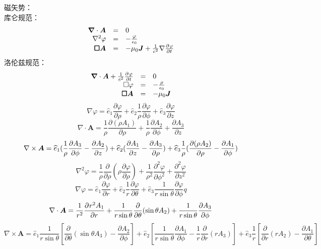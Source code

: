 \documentclass[UTF8,9pt]{ctexart}
\begin{document}
磁矢势：\\
库仑规范：
$$\ar[rcl]{
    \bm{\nabla}\cdot \bm{A}&=&0\\
    \nabla^2 \varphi&=&-\f{\varphi}{\epsilon_0}\\
    \bm{\square A}&=&-\mu_0\bm{J}+\ff{c^2}\nabla\pt{\varphi}
}$$
洛伦兹规范：
$$\ar[rcl]{
    \bm{\nabla}\cdot\bm{A}+\ff{c^2}\pt{\varphi}&=&0\\
    \square \varphi&=&-\f{\rho}{\epsilon_0}\\
    \bm{\square A}&=&-\mu_0\bm{J}
}$$
$$\nabla \varphi = \hat e_1 \frac { \partial \varphi } { \partial \rho } + \hat e_2 \frac { 1 } { \rho } \frac { \partial \varphi } { \partial \phi } + \hat { e } _ { 3 } \frac { \partial \varphi } { \partial z }$$
$$\nabla \cdot \bm{ A } = \frac { 1 } { \rho } \frac { \partial ( \rho A _ { 1 } ) } { \partial \rho } + \frac { 1 } { \rho } \frac { \partial A _ { 2 } } { \partial \phi } + \frac { \partial A _ { 3 } } { \partial z }$$
$$ { \nabla \times \bm{ A } } =\hat e_1 (\ff{\rho} \frac { \partial A_3} { \partial \phi } - \frac { \partial A _ { 2 } } { \partial z } ) + \hat { e } _ { 2 } ( \frac { \partial A _ { 1 } } { \partial z } - \frac { \partial A _ { 3 } } { \partial \rho } ) + \hat { e } _ { 3 } \frac { 1 } { \rho } ( \frac { \partial ( \rho A _ { 2 } ) } { \partial \rho } - \frac { \partial A _ { 1 } } { \partial \phi } )$$
$$\nabla ^ { 2 } \varphi = \frac { 1 } { \rho } \frac { \partial } { \partial \rho } ( \rho \frac { \partial \varphi } { \partial \rho } ) + \frac { 1 } { \rho ^ { 2 } } \frac { \partial ^ { 2 } \varphi } { \partial \phi ^ { 2 } } + \frac { \partial ^ { 2 } \varphi } { \partial z ^ { 2 } }$$
$$\nabla \varphi = \hat { e } _ { 1 } \frac { \partial \varphi } { \partial r } + \hat { e } _ { 2 } \frac { 1 } { r } \frac { \partial \varphi } { \partial \theta } + \hat { e } _ { 3 } \frac { 1 } { r \sin \theta } \frac { \partial \varphi } { \partial \phi }q$$
$$\nabla \cdot \bm{ A } = \ff{r^2} \pp{r^2A_1}{r} + \frac { 1 } { r \sin \theta } \frac { \partial } { \partial \theta } ( \sin \theta A _ { 2 } ) + \frac { 1 } { r \sin \theta } \frac { \partial A _ { 3 } } { \partial \phi }$$
$$\nabla \times \bm{ A }  = 
\hat { e } _ { 1 } \frac { 1 } { r \sin \theta } \left[ \frac { \partial } { \partial \theta } ( \sin \theta A _ { 3 } ) - \frac { \partial A _ { 2 } } { \partial \phi } \right]  
+ \hat { e } _ { 2 } \left[ \frac { 1 } { r \sin \theta } \frac { \partial A _ { 1 } } { \partial \phi } - \frac { 1 } { r } \frac { \partial } { \partial r } ( r A _ { 3 } ) \right] 
+ \hat { e } _ { 3 } \frac { 1 } { r } \left[ \frac { \partial } { \partial r } ( r A _ { 2 } ) - \frac { \partial A _ { 1 } } { \partial \theta } \right] $$
\end{document}
